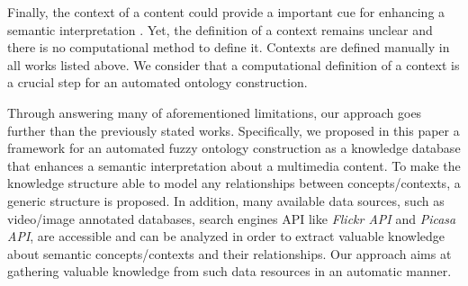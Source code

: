 	Finally, the context of a content could provide a important cue
	for enhancing a semantic interpretation \citep{Fauzi2014}.  Yet, the definition of a context remains
	unclear and there is no computational method to define it. Contexts are defined manually in all works
	listed above. We consider that a computational definition of a context is a crucial step for an automated
	ontology construction.

	Through answering many of aforementioned limitations, our approach goes further than the previously
	stated works. Specifically, we proposed in this paper a framework for an automated fuzzy ontology
	construction as a knowledge database that enhances a semantic interpretation about a multimedia content.
	To make the knowledge structure able to model any relationships between concepts/contexts, a generic structure
	is proposed. In addition, many available data sources, such as video/image annotated databases, search
	engines API like \emph{Flickr API} and \emph{Picasa API}, are accessible and can be analyzed in order
	to extract valuable knowledge about semantic concepts/contexts and their relationships. Our approach
	aims at gathering valuable knowledge from such data resources in an automatic manner.
